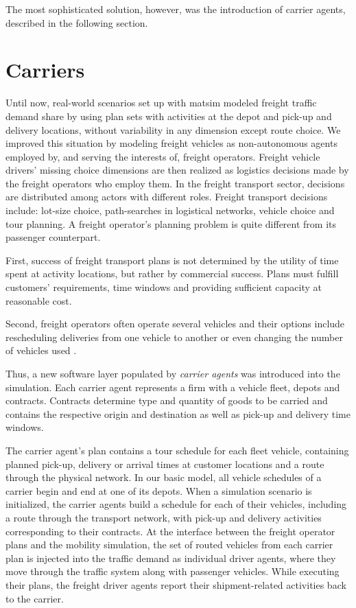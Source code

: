 The most sophisticated solution, however, was the introduction of carrier agents, described in the following section. 

\section{Carriers}
\label{sec:carriers}
Until now, real-world scenarios set up with \gls{matsim} modeled freight traffic demand share by using plan sets with activities at the depot and pick-up and delivery locations, without variability in any dimension except route choice. We improved this situation by modeling freight vehicles as non-autonomous agents employed by, and serving the interests of, freight operators. Freight vehicle drivers' missing choice dimensions are then realized as logistics decisions made by the freight operators who employ them. In the freight transport sector, decisions are distributed among actors with different roles. Freight transport decisions include: lot-size choice, path-searches in logistical networks, vehicle choice and tour planning. A freight operator's planning problem is quite different from its passenger counterpart.

First, success of freight transport plans is not determined by the utility of time
spent at activity locations, but rather by commercial success. Plans must fulfill
customers' requirements, \ie time windows and providing sufficient capacity at
reasonable cost.

Second, freight operators often operate several vehicles and their
options include rescheduling deliveries from one vehicle to another or even changing the
number of vehicles used .

Thus, a new software layer populated by \emph{carrier agents} was introduced into the
simulation. Each carrier agent represents a firm with a vehicle fleet, depots and contracts.
Contracts determine type and quantity of goods to be carried and contains the respective 
origin and destination as well as pick-up and delivery time windows.

The carrier agent's plan contains a tour schedule  for each fleet  vehicle, containing 
planned pick-up, delivery or arrival times at customer locations and a route through 
the physical network. In our basic model, all vehicle schedules of a carrier begin and end at one of its depots.
When a simulation scenario is initialized, the carrier agents build a schedule for each of their vehicles, 
including a route through the transport network, with pick-up and delivery activities corresponding to their contracts.
At the interface between the freight operator plans and the mobility simulation, the set of routed vehicles 
from each carrier plan is injected into the traffic demand as individual driver agents, where they move 
through the traffic system along with passenger vehicles. While executing their plans, the freight driver 
agents report their shipment-related activities back to the carrier.

